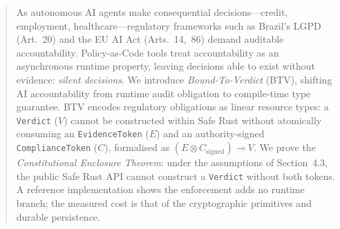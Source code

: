 
\begin{abstract}
As autonomous AI agents make consequential decisions---credit,
employment, healthcare---regulatory frameworks such as Brazil's LGPD
(Art.~20) and the EU AI Act (Arts.~14,~86) demand auditable
accountability.  Policy-as-Code tools treat accountability as an
asynchronous runtime property, leaving decisions able to exist
without evidence: \emph{silent decisions}.
We introduce \emph{Bound-To-Verdict} (BTV), shifting AI
accountability from runtime audit obligation to compile-time type
guarantee.  BTV encodes regulatory obligations
as linear resource types: a \texttt{Verdict} ($V$) cannot be constructed
within Safe Rust without atomically consuming an
\texttt{EvidenceToken} ($E$) and an authority-signed
\texttt{ComplianceToken} ($C$), formalised as $(E \otimes
C_{\text{signed}}) \multimap V$.  We prove the \emph{Constitutional Enclosure
Theorem}: under the assumptions of Section~4.3, the public Safe Rust API
cannot construct a \texttt{Verdict} without both tokens.  A reference
implementation shows the enforcement adds no runtime branch; the measured
cost is that of the cryptographic primitives and durable persistence.
\end{abstract}
